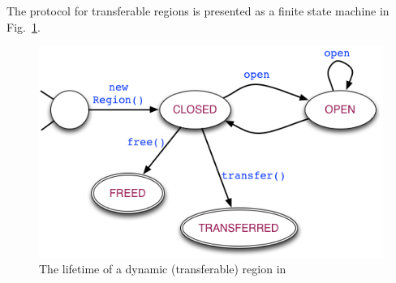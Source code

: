%


The protocol for transferable regions is presented as a finite state machine in Fig.~\ref{fig:region-fsm}.

\begin{figure}
\includegraphics[scale=0.45]{region-fsm.png}
\caption{The lifetime of a dynamic (transferable) region in \name}
\label{fig:region-fsm}
\end{figure}

